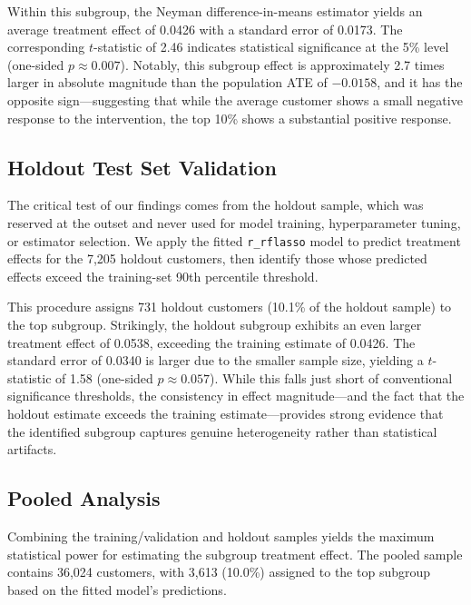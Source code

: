 \documentclass[11pt,a4paper]{article}
\begin{document}
Within this subgroup, the Neyman difference-in-means estimator yields an average treatment effect of 0.0426 with a standard error of 0.0173. The corresponding $t$-statistic of 2.46 indicates statistical significance at the 5\% level (one-sided $p \approx 0.007$). Notably, this subgroup effect is approximately 2.7 times larger in absolute magnitude than the population ATE of $-0.0158$, and it has the opposite sign---suggesting that while the average customer shows a small negative response to the intervention, the top 10\% shows a substantial positive response.

\subsection{Holdout Test Set Validation}
The critical test of our findings comes from the holdout sample, which was reserved at the outset and never used for model training, hyperparameter tuning, or estimator selection. We apply the fitted \texttt{r\_rflasso} model to predict treatment effects for the 7,205 holdout customers, then identify those whose predicted effects exceed the training-set 90th percentile threshold.

This procedure assigns 731 holdout customers (10.1\% of the holdout sample) to the top subgroup. Strikingly, the holdout subgroup exhibits an even larger treatment effect of 0.0538, exceeding the training estimate of 0.0426. The standard error of 0.0340 is larger due to the smaller sample size, yielding a $t$-statistic of 1.58 (one-sided $p \approx 0.057$). While this falls just short of conventional significance thresholds, the consistency in effect magnitude---and the fact that the holdout estimate exceeds the training estimate---provides strong evidence that the identified subgroup captures genuine heterogeneity rather than statistical artifacts.

\subsection{Pooled Analysis}
Combining the training/validation and holdout samples yields the maximum statistical power for estimating the subgroup treatment effect. The pooled sample contains 36,024 customers, with 3,613 (10.0\%) assigned to the top subgroup based on the fitted model's predictions.
\end{document}
